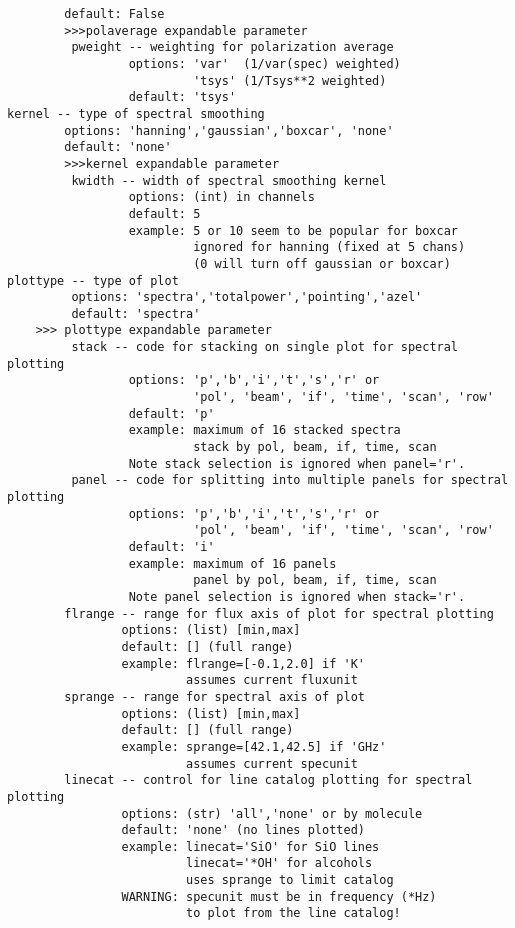 \begin{verbatim}
        default: False
        >>>polaverage expandable parameter
         pweight -- weighting for polarization average
                 options: 'var'  (1/var(spec) weighted)
                          'tsys' (1/Tsys**2 weighted)
                 default: 'tsys'
kernel -- type of spectral smoothing
        options: 'hanning','gaussian','boxcar', 'none'
        default: 'none'
        >>>kernel expandable parameter
         kwidth -- width of spectral smoothing kernel
                 options: (int) in channels
                 default: 5
                 example: 5 or 10 seem to be popular for boxcar
                          ignored for hanning (fixed at 5 chans)
                          (0 will turn off gaussian or boxcar)
plottype -- type of plot
         options: 'spectra','totalpower','pointing','azel'
         default: 'spectra'
    >>> plottype expandable parameter
         stack -- code for stacking on single plot for spectral plotting
                 options: 'p','b','i','t','s','r' or
                          'pol', 'beam', 'if', 'time', 'scan', 'row'
                 default: 'p'
                 example: maximum of 16 stacked spectra
                          stack by pol, beam, if, time, scan
                 Note stack selection is ignored when panel='r'.
         panel -- code for splitting into multiple panels for spectral plotting
                 options: 'p','b','i','t','s','r' or
                          'pol', 'beam', 'if', 'time', 'scan', 'row'
                 default: 'i'
                 example: maximum of 16 panels
                          panel by pol, beam, if, time, scan
                 Note panel selection is ignored when stack='r'.
        flrange -- range for flux axis of plot for spectral plotting
                options: (list) [min,max]
                default: [] (full range)
                example: flrange=[-0.1,2.0] if 'K'
                         assumes current fluxunit
        sprange -- range for spectral axis of plot
                options: (list) [min,max]
                default: [] (full range)
                example: sprange=[42.1,42.5] if 'GHz'
                         assumes current specunit
        linecat -- control for line catalog plotting for spectral plotting
                options: (str) 'all','none' or by molecule
                default: 'none' (no lines plotted)
                example: linecat='SiO' for SiO lines
                         linecat='*OH' for alcohols
                         uses sprange to limit catalog
                WARNING: specunit must be in frequency (*Hz)
                         to plot from the line catalog!

\end{verbatim}
